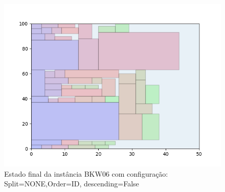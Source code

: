 \begin{figure}[H]
    \centering
    \caption[]{Estado final da instância BKW06 com configuração: Split=NONE,Order=ID, descending=False}
    \label{fig:bkw06-none-id-false}
    \includegraphics[scale=0.5]{output/figures/bkw/bkw06/none/id/false/00}
\end{figure}
